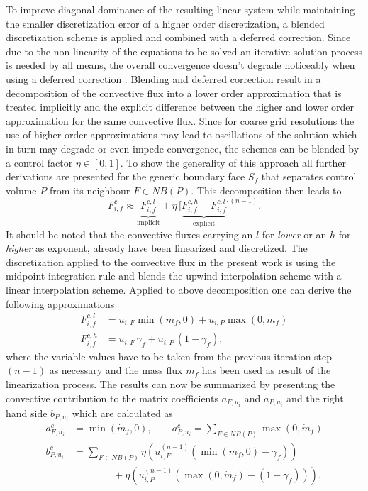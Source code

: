       To improve diagonal dominance of the resulting linear system while maintaining the smaller discretization error of a higher order discretization, a blended discretization scheme is applied and combined with a deferred correction. Since due to the non-linearity of the equations to be solved an iterative solution process is needed by all means, the overall convergence doesn't degrade noticeably when using a deferred correction \cite{ferziger02}. Blending and deferred correction result in a decomposition of the convective flux into a lower order approximation that is treated implicitly and the explicit difference between the higher and lower order approximation for the same convective flux. Since for coarse grid resolutions the use of higher order approximations may lead to oscillations of the solution which in turn may degrade or even impede convergence, the schemes can be blended by a control factor \( \eta \in [0,1]\). To show the generality of this approach all further derivations are presented for the generic boundary face \(S_f\) that separates control volume \(P\) from its neighbour \(F \in NB(P)\). This decomposition then leads to
      \begin{displaymath}
        F_{i,f}^c \approx  \underbrace{F_{i,f}^{c,l}}_{\text{implicit}} + \eta \, \bigl[\underbrace{ F_{i,f}^{c,h} - F_{i,f}^{c,l} }_{\text{explicit}}\bigr]^{(n-1)}.
      \end{displaymath}
      It should be noted that the convective fluxes carrying an \(l\) for \emph{lower} or an \(h\) for \emph{higher} as exponent, already have been linearized and discretized. The discretization applied to the convective flux in the present work is using the midpoint integration rule and blends the upwind interpolation scheme with a linear interpolation scheme. Applied to above decomposition one can derive the following approximations
      \begin{align*}
        F_{i,f}^{c,l} &= u_{i,F} \min(\dot{m}_f ,0) + u_{i,P} \max(0,\dot{m}_f) \\
        F_{i,f}^{c,h} &= u_{i,F} \, \gamma_f + u_{i,P} \, (1 - \gamma_f),
      \end{align*}
      where the variable values have to be taken from the previous iteration step \((n-1)\) as necessary and the mass flux \(\dot{m}_f\) has been used as result of the linearization process. The results can now be summarized by presenting the convective contribution to the matrix coefficients \(a_{F,u_i}\) and \(a_{P,u_i}\) and the right hand side \(b_{P,u_i}\) which are calculated as
      \begin{subequations}
      \begin{align}
        a_{F,u_i}^c &= \min(\dot{m}_f ,0), \quad \quad a_{P,u_i}^c = \sum_{F \in NB(P)} \max(0,\dot{m}_f) \\[1em]
        b_{P,u_i}^c &= \sum_{F \in NB(P)} \eta  \left(u_{i,F}^{(n-1)} \left( \min(\dot{m}_f,0) - \gamma_f \right)\right) \nonumber \\
                    &\quad \quad \quad  \quad+ \eta \left( u_{i,P}^{(n-1)} \left( \max(0,\dot{m}_f) - \left(1 - \gamma_f\right) \right)\right).
      \end{align}
    \end{subequations}

